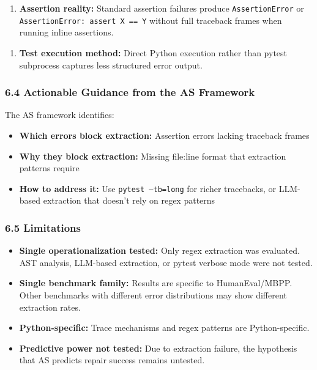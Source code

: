 \begin{enumerate}
\item \textbf{Assertion reality:} Standard assertion failures produce \texttt{AssertionError} or \texttt{AssertionError: assert X == Y} without full traceback frames when running inline assertions.
\end{enumerate}

\begin{enumerate}
\item \textbf{Test execution method:} Direct Python execution rather than pytest subprocess captures less structured error output.
\end{enumerate}

\subsubsection{6.4 Actionable Guidance from the AS Framework}

The AS framework identifies:
\begin{itemize}
\item \textbf{Which errors block extraction:} Assertion errors lacking traceback frames
\item \textbf{Why they block extraction:} Missing file:line format that extraction patterns require
\item \textbf{How to address it:} Use \texttt{pytest --tb=long} for richer tracebacks, or LLM-based extraction that doesn't rely on regex patterns
\end{itemize}

\subsubsection{6.5 Limitations}

\begin{itemize}
\item \textbf{Single operationalization tested:} Only regex extraction was evaluated. AST analysis, LLM-based extraction, or pytest verbose mode were not tested.
\item \textbf{Single benchmark family:} Results are specific to HumanEval/MBPP. Other benchmarks with different error distributions may show different extraction rates.
\item \textbf{Python-specific:} Trace mechanisms and regex patterns are Python-specific.
\item \textbf{Predictive power not tested:} Due to extraction failure, the hypothesis that AS predicts repair success remains untested.
\end{itemize}

